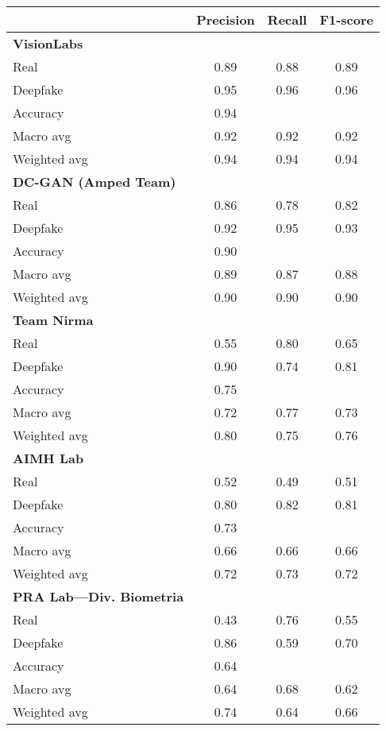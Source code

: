 \begin{table}[h]
    \centering
    \label{tab:comparison}
    \begin{tabular}{|l|c|c|c|}
    \hline
     & \textbf{Precision} & \textbf{Recall} & \textbf{F1-score} \\ \hline
    \textbf{VisionLabs} &  &  &  \\ \hline
    Real & 0.89 & 0.88 & 0.89 \\ 
    Deepfake & 0.95 & 0.96 & 0.96 \\ 
    Accuracy & 0.94 & & \\ 
    Macro avg & 0.92 & 0.92 & 0.92 \\ 
    Weighted avg & 0.94 & 0.94 & 0.94 \\ \hline
    \textbf{DC-GAN (Amped Team)} & & & \\ \hline
    Real & 0.86 & 0.78 & 0.82 \\ 
    Deepfake & 0.92 & 0.95 & 0.93 \\ 
    Accuracy & 0.90 & & \\ 
    Macro avg & 0.89 & 0.87 & 0.88 \\ 
    Weighted avg & 0.90 & 0.90 & 0.90 \\ \hline
    \textbf{Team Nirma} & & & \\ \hline
    Real & 0.55 & 0.80 & 0.65 \\ 
    Deepfake & 0.90 & 0.74 & 0.81 \\ 
    Accuracy & 0.75 & & \\ 
    Macro avg & 0.72 & 0.77 & 0.73 \\ 
    Weighted avg & 0.80 & 0.75 & 0.76 \\ \hline
    \textbf{AIMH Lab} & & & \\ \hline
    Real & 0.52 & 0.49 & 0.51 \\ 
    Deepfake & 0.80 & 0.82 & 0.81 \\ 
    Accuracy & 0.73 & & \\ 
    Macro avg & 0.66 & 0.66 & 0.66 \\ 
    Weighted avg & 0.72 & 0.73 & 0.72 \\ \hline
    \textbf{PRA Lab—Div. Biometria} & & & \\ \hline
    Real & 0.43 & 0.76 & 0.55 \\ 
    Deepfake & 0.86 & 0.59 & 0.70 \\ 
    Accuracy & 0.64 & & \\ 
    Macro avg & 0.64 & 0.68 & 0.62 \\ 
    Weighted avg & 0.74 & 0.64 & 0.66 \\ \hline

\end{tabular}
\end{table}
